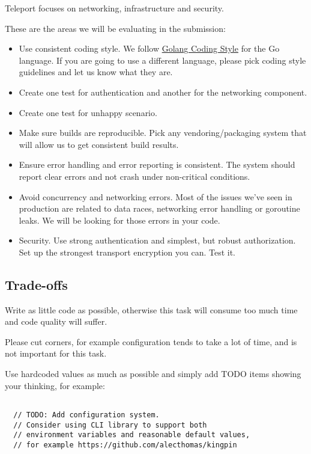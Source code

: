 \documentclass{article}
\begin{document}
Teleport focuses on networking, infrastructure and security.

These are the areas we will be evaluating in the submission:

  \begin{itemize}
  \item Use consistent coding style. We follow \href{https://github.com/golang/go/wiki/CodeReviewComments}{Golang Coding Style} for the Go language. If you are going to use a different language, please pick coding style guidelines and let us know what they are.
  \item Create one test for authentication and another for the networking component.
  \item Create one test for unhappy scenario.
  \item Make sure builds are reproducible. Pick any vendoring/packaging system that will allow us to get consistent build results.
  \item Ensure error handling and error reporting is consistent. The system should report clear errors and not crash under non-critical conditions.
  \item Avoid concurrency and networking errors. Most of the issues we've seen in production are related to data races, networking error handling or goroutine leaks. We will be looking for those errors in your code.
  \item Security. Use strong authentication and simplest, but robust authorization. Set up the strongest transport encryption you can. Test it.
  \end{itemize}

\subsection{Trade-offs}
       
Write as little code as possible, otherwise this task will consume too much time and code quality will suffer.

Please cut corners, for example configuration tends to take a lot of time, and is not important for this task.

Use hardcoded values as much as possible and simply add TODO items showing your thinking, for example:

\begin{lstlisting}[caption=TODO example]
  
  // TODO: Add configuration system.
  // Consider using CLI library to support both
  // environment variables and reasonable default values,
  // for example https://github.com/alecthomas/kingpin

\end{lstlisting}
\end{document}
